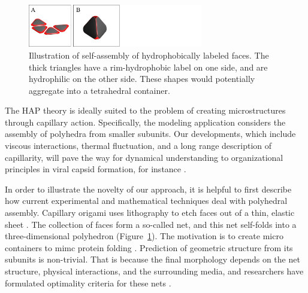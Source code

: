 
\begin{figure}
\vspace*{+15pt}
\centerline{\includegraphics[width=3.0in]{figures/SA3_fig2.pdf}}
\vspace*{5pt}
\caption{{\footnotesize Illustration of self-assembly of hydrophobically labeled faces.
The thick triangles have a rim-hydrophobic label on one side, and are hydrophilic on the other side.
These shapes would potentially aggregate into a tetrahedral container. }}
\label{fig:illustration}
\end{figure}
The HAP theory is ideally suited to the problem of creating microstructures through capillary action. Specifically, the modeling application considers the assembly of polyhedra from smaller subunits. Our developments, which include viscous interactions, thermal fluctuation, and a long range description of capillarity, will pave the way for dynamical understanding to organizational principles in viral capsid formation, for instance \cite{CASPAR1962,Prasad2012}. 

In order to illustrate the novelty of our approach, it is helpful to first describe how current experimental and mathematical techniques deal with polyhedral assembly. Capillary origami uses lithography to etch faces out of a thin, elastic sheet \cite{Pandey2011,Reynolds2019}. The collection of faces form a so-called net, and this net self-folds into a three-dimensional polyhedron (Figure~\ref{fig:illustration}). The motivation is to create micro containers to mimc protein folding \cite{Reynolds2019}. Prediction of geometric structure from its subunits is non-trivial. That is because the final morphology depends on the net structure, physical interactions, and the surrounding media, and researchers have formulated optimality criteria for these nets \cite{Araujo2018,Pandey2011}. 

